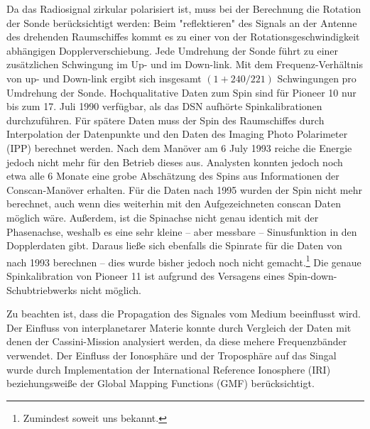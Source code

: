 Da das Radiosignal zirkular polarisiert ist, muss bei der Berechnung die Rotation der Sonde berücksichtigt werden: Beim "reflektieren" des Signals an der Antenne des drehenden Raumschiffes kommt es zu einer von der Rotationsgeschwindigkeit abhängigen Dopplerverschiebung. Jede Umdrehung der Sonde führt zu einer zusätzlichen Schwingung im Up- und im Down-link. Mit dem Frequenz-Verhältnis von up- und Down-link ergibt sich insgesamt $(1+240/221)$ Schwingungen pro Umdrehung der Sonde.\cite{Anderson2002} %
Hochqualitative Daten zum Spin sind für Pioneer 10 nur bis zum 17. Juli 1990 verfügbar, als das DSN aufhörte Spinkalibrationen durchzuführen. Für spätere Daten muss der Spin des Raumschiffes durch Interpolation der Datenpunkte und den Daten des Imaging Photo Polarimeter (IPP) berechnet werden. Nach dem Manöver am 6 July 1993 reiche die Energie jedoch nicht mehr für den Betrieb dieses aus. Analysten konnten jedoch noch etwa alle 6 Monate eine grobe Abschätzung des Spins aus Informationen der Conscan-Manöver erhalten. %
Für die Daten nach 1995 wurden der Spin nicht mehr berechnet, auch wenn dies weiterhin mit den Aufgezeichneten conscan Daten möglich wäre. Außerdem, ist die Spinachse nicht genau identich mit der Phasenachse, weshalb es eine sehr kleine – aber messbare – Sinusfunktion in den Dopplerdaten gibt. Daraus ließe sich ebenfalls die Spinrate für die Daten von nach 1993 berechnen – dies wurde bisher jedoch noch nicht gemacht.\footnote{Zumindest soweit uns bekannt.}
Die genaue Spinkalibration von Pioneer 11 ist aufgrund des Versagens eines Spin-down-Schubtriebwerks nicht möglich.\cite{Anderson2002}

Zu beachten ist, dass die Propagation des Signales vom Medium beeinflusst wird. Der Einfluss von interplanetarer Materie konnte durch Vergleich
der Daten mit denen der Cassini-Mission analysiert werden, da diese mehere Frequenzbänder verwendet.\cite{Dittus2006} %
Der Einfluss der Ionosphäre und der Troposphäre auf das Singal wurde durch Implementation der International Reference Ionosphere (IRI)
beziehungsweiße der Global Mapping Functions (GMF) berücksichtigt.\cite{Levy2008} %

